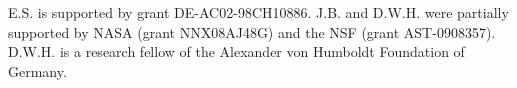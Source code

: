 \documentclass[12pt,preprint]{aastex}
\begin{document}

\acknowledgements E.S. is supported by grant DE-AC02-98CH10886.
J.B. and D.W.H. were partially supported by NASA
(grant NNX08AJ48G) and the NSF (grant AST-0908357). D.W.H. is a
research fellow of the Alexander von Humboldt Foundation of Germany.





\end{document}
